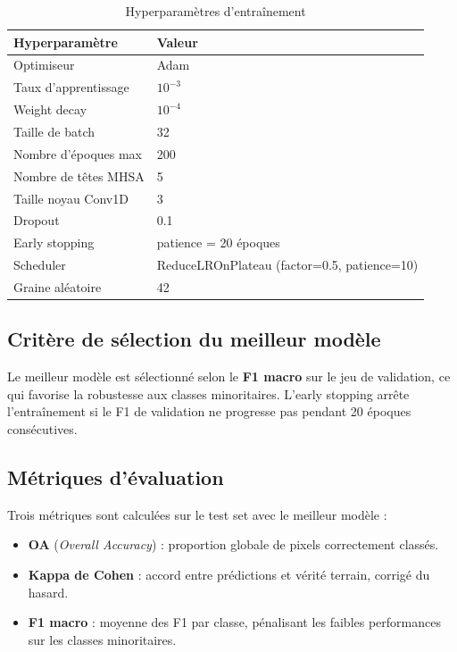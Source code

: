 \begin{table}[H]
\centering
\caption{Hyperparamètres d'entraînement}
\label{tab:hyperparams}
\begin{tabular}{ll}
\toprule
\textbf{Hyperparamètre} & \textbf{Valeur} \\
\midrule
Optimiseur            & Adam \\
Taux d'apprentissage  & $10^{-3}$ \\
Weight decay          & $10^{-4}$ \\
Taille de batch       & 32 \\
Nombre d'époques max  & 200 \\
Nombre de têtes MHSA  & 5 \\
Taille noyau Conv1D   & 3 \\
Dropout               & 0.1 \\
\midrule
Early stopping        & patience = 20 époques \\
Scheduler             & ReduceLROnPlateau (factor=0.5, patience=10) \\
Graine aléatoire      & 42 \\
\bottomrule
\end{tabular}
\end{table}

\subsection{Critère de sélection du meilleur modèle}

Le meilleur modèle est sélectionné selon le \textbf{F1 macro} sur le jeu de
validation, ce qui favorise la robustesse aux classes minoritaires. L'early
stopping arrête l'entraînement si le F1 de validation ne progresse pas pendant
20 époques consécutives.

\subsection{Métriques d'évaluation}

Trois métriques sont calculées sur le test set avec le meilleur modèle :

\begin{itemize}
  \item \textbf{OA} (\textit{Overall Accuracy}) : proportion globale de pixels
        correctement classés.
  \item \textbf{Kappa de Cohen} : accord entre prédictions et vérité terrain,
        corrigé du hasard.
  \item \textbf{F1 macro} : moyenne des F1 par classe, pénalisant les faibles
        performances sur les classes minoritaires.
\end{itemize}

